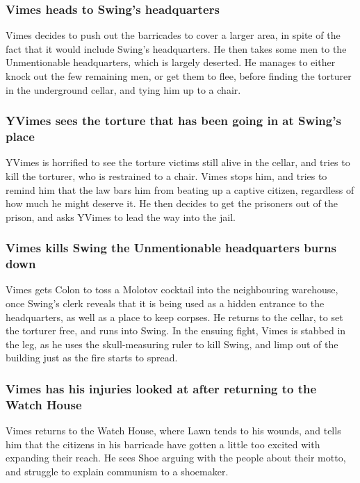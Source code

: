 \subsubsection{\Gls{Vimes} heads to \Gls{Swing}'s headquarters}
\Gls{Vimes} decides to push out the barricades to cover a larger area, in spite of the fact that it
would include \Gls{Swing}'s headquarters. He then takes some men to the Unmentionable headquarters,
which is largely deserted. He manages to either knock out the few remaining men, or get them to
flee, before finding the torturer in the underground cellar, and tying him up to a chair.

\subsubsection{\Gls{YVimes} sees the torture that has been going in at \Gls{Swing}'s place}
\Gls{YVimes} is horrified to see the torture victims still alive in the cellar, and tries to kill
the torturer, who is restrained to a chair. \Gls{Vimes} stops him, and tries to remind him that the
law bars him from beating up a captive citizen, regardless of how much he might deserve it. He then
decides to get the prisoners out of the prison, and asks \Gls{YVimes} to lead the way into the jail.

\subsubsection{\Gls{Vimes} kills \Gls{Swing} the Unmentionable headquarters burns down}
\Gls{Vimes} gets \Gls{Colon} to toss a Molotov cocktail into the neighbouring warehouse, once
\Gls{Swing}'s clerk reveals that it is being used as a hidden entrance to the headquarters, as well
as a place to keep corpses. He returns to the cellar, to set the torturer free, and runs into
\Gls{Swing}. In the ensuing fight, \Gls{Vimes} is stabbed in the leg, as he uses the skull-measuring
ruler to kill \Gls{Swing}, and limp out of the building just as the fire starts to spread.

\subsubsection{\Gls{Vimes} has his injuries looked at after returning to the Watch House}
\Gls{Vimes} returns to the Watch House, where \Gls{Lawn} tends to his wounds, and tells him that the
citizens in his barricade have gotten a little too excited with expanding their reach. He sees
\Gls{Shoe} arguing with the people about their motto, and struggle to explain communism to a
shoemaker.

